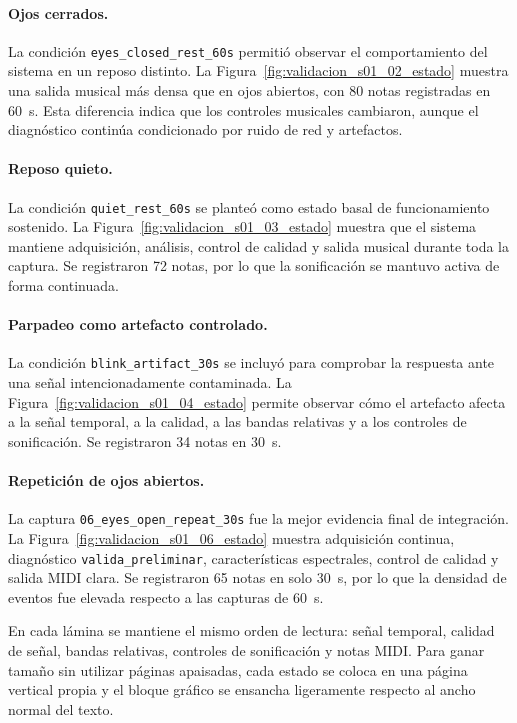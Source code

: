 \paragraph{Ojos cerrados.}
La condición \texttt{eyes\_closed\_rest\_60s} permitió observar el comportamiento del sistema en un reposo distinto. La Figura~\ref{fig:validacion_s01_02_estado} muestra una salida musical más densa que en ojos abiertos, con 80 notas registradas en \SI{60}{\second}. Esta diferencia indica que los controles musicales cambiaron, aunque el diagnóstico continúa condicionado por ruido de red y artefactos.

\paragraph{Reposo quieto.}
La condición \texttt{quiet\_rest\_60s} se planteó como estado basal de funcionamiento sostenido. La Figura~\ref{fig:validacion_s01_03_estado} muestra que el sistema mantiene adquisición, análisis, control de calidad y salida musical durante toda la captura. Se registraron 72 notas, por lo que la sonificación se mantuvo activa de forma continuada.

\paragraph{Parpadeo como artefacto controlado.}
La condición \texttt{blink\_artifact\_30s} se incluyó para comprobar la respuesta ante una señal intencionadamente contaminada. La Figura~\ref{fig:validacion_s01_04_estado} permite observar cómo el artefacto afecta a la señal temporal, a la calidad, a las bandas relativas y a los controles de sonificación. Se registraron 34 notas en \SI{30}{\second}.

\paragraph{Repetición de ojos abiertos.}
La captura \texttt{06\_eyes\_open\_repeat\_30s} fue la mejor evidencia final de integración. La Figura~\ref{fig:validacion_s01_06_estado} muestra adquisición continua, diagnóstico \texttt{valida\_preliminar}, características espectrales, control de calidad y salida MIDI clara. Se registraron 65 notas en solo \SI{30}{\second}, por lo que la densidad de eventos fue elevada respecto a las capturas de \SI{60}{\second}.

En cada lámina se mantiene el mismo orden de lectura: señal temporal, calidad de señal, bandas relativas, controles de sonificación y notas MIDI. Para ganar tamaño sin utilizar páginas apaisadas, cada estado se coloca en una página vertical propia y el bloque gráfico se ensancha ligeramente respecto al ancho normal del texto.

